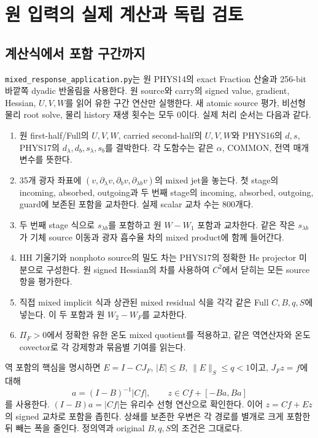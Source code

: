 \clearpage
\section{원 입력의 실제 계산과 독립 검토}

\subsection{계산식에서 포함 구간까지}

\texttt{mixed\_response\_application.py}는 원 PHYS14의 exact Fraction
산술과 256-bit 바깥쪽 dyadic 반올림을 사용한다. 원 source와 carry의
signed value, gradient, Hessian, $U,V,W$를 읽어 유한 구간 연산만
실행한다. 새 atomic source 평가, 비선형 물리 root solve, 물리 history
재생 횟수는 모두 0이다. 실제 처리 순서는 다음과 같다.

\begin{enumerate}
\item 원 first-half/Full의 $U,V,W$, carried second-half의 $U,V,W$와
PHYS16의 $d,s$, PHYS17의 $d_\lambda,d_b,s_\lambda,s_b$를 결박한다.
각 도함수는 같은 $\alpha$, COMMON, 전역 매개변수를 뜻한다.
\item 35개 광자 좌표에 $(v,\partial_\lambda v,\partial_bv,
\partial_{\lambda b}v)$의 mixed jet을 놓는다. 첫 stage의 incoming,
absorbed, outgoing과 두 번째 stage의 incoming, absorbed, outgoing,
guard에 보존된 포함을 교차한다. 실제 scalar 교차 수는 800개다.
\item 두 번째 stage 식으로 $s_{\lambda b}$를 포함하고 원 $W-W_1$
포함과 교차한다. 같은 작은 $s_{\lambda b}$가 기체 source 이동과
광자 흡수율 차의 mixed product에 함께 들어간다.
\item HH 기울기와 nonphoto source의 밀도 차는 PHYS17의 정확한 He
projector 미분으로 구성한다. 원 signed Hessian의 차를 사용하여
$C^2$에서 닫히는 모든 source 항을 평가한다.
\item 직접 mixed implicit 식과 상관된 mixed residual 식을 각각
같은 Full $C,B,q,S$에 넣는다. 이 두 포함과 원 $W_2-W_F$를 교차한다.
\item $\Pi_F>0$에서 정확한 유한 온도 mixed quotient를 적용하고,
같은 역연산자와 온도 covector로 각 강제항과 묶음별 기여를 읽는다.
\end{enumerate}

역 포함의 핵심을 명시하면 $E=I-CJ_F$, $|E|\le B$,
$\|E\|_S\le q<1$이고, $J_Fz=f$에 대해
\[
a=(I-B)^{-1}|Cf|,\qquad
z\in Cf+[-Ba,Ba]
\]
를 사용한다. $(I-B)a=|Cf|$는 유리수 선형 연산으로 확인한다.
이어 $z=Cf+Ez$의 signed 교차로 포함을 좁힌다.
상쇄를 보존한 우변은 각 경로를 별개로 크게 포함한 뒤 빼는 폭을 줄인다.
정의역과 original $B,q,S$의 조건은 그대로다.

